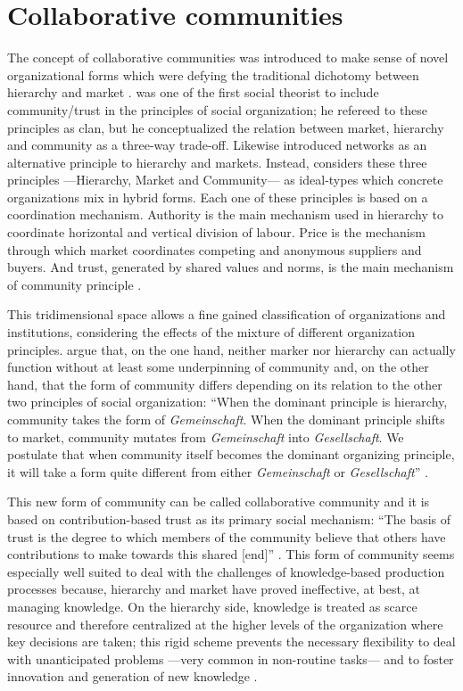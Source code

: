 \section{Collaborative communities}

The concept of collaborative communities was introduced to make sense of novel organizational forms which were defying the traditional dichotomy between hierarchy and market \citep{coase:1937,williamson:1975}. \citet{ouchi:1980} was one of the first social theorist to include community/trust in the principles of social organization; he refereed to these principles as clan, but he conceptualized the relation between market, hierarchy and community as a three-way trade-off. Likewise \citet{powell:1990} introduced networks as an alternative principle to hierarchy and markets. Instead, \citet{adler:2001} considers these three principles ---Hierarchy, Market and Community--- as ideal-types which concrete organizations mix in hybrid forms.  Each one of these principles is based on a coordination mechanism. Authority is the main mechanism used in hierarchy to coordinate horizontal and vertical division of labour. Price is the mechanism through which market coordinates competing and anonymous suppliers and buyers. And trust, generated by shared values and norms, is the main mechanism of community principle \citep{adler:2001}.

This tridimensional space allows a fine gained classification of organizations and institutions, considering the effects of the mixture of different organization principles. \citet{adler:2006} argue that, on the one hand, neither marker nor hierarchy can actually function without at least some underpinning of community and, on the other hand, that the form of community differs depending on its relation to the other two principles of social organization: ``When the dominant principle is hierarchy, community takes the form of \emph{Gemeinschaft}. When the dominant principle shifts to market, community mutates from \emph{Gemeinschaft} into \emph{Gesellschaft}. We postulate that when community itself becomes the dominant organizing principle, it will take a form quite different from either \emph{Gemeinschaft} or \emph{Gesellschaft}'' \citep[16]{adler:2006}.

This new form of community can be called collaborative community and it is based on contribution-based trust as its primary social mechanism: ``The basis of trust is the degree to which members of the community believe that others have contributions to make towards this shared [end]'' \citep[21]{adler:2006}. This form of community seems especially well suited to deal with the challenges of knowledge-based production processes because, hierarchy and market have proved ineffective, at best, at managing knowledge. On the hierarchy side, knowledge is treated as scarce resource and therefore centralized at the higher levels of the organization where key decisions are taken; this rigid scheme prevents the necessary flexibility to deal with unanticipated problems ---very common in non-routine tasks--- and to foster innovation and generation of new knowledge \citep[216]{adler:2001}. 

